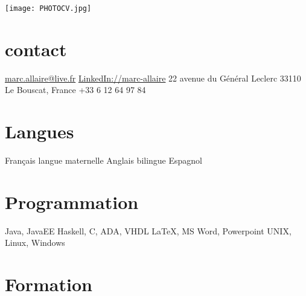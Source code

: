 \documentclass[]{friggeri-cv} %
\begin{document}


\begin{aside} %
\texttt{[image: PHOTOCV.jpg]}
\section{contact}
\href{mailto:marc.allaire@live.fr}{marc.allaire@live.fr}
\href{http://www.linkedin.com/pub/marc-allaire/62/79/936}{LinkedIn://marc-allaire}
22 avenue du Général Leclerc
33110 Le Bouscat, France
+33 6 12 64 97 84
\section{Langues}
Français langue maternelle
Anglais bilingue
Espagnol 
\section{Programmation}
Java, JavaEE
Haskell, 
C, ADA, VHDL
\LaTeX, MS Word, Powerpoint
UNIX, Linux, Windows
\end{aside}

\vspace{-0.2cm}

\section{Formation}
\end{document}
